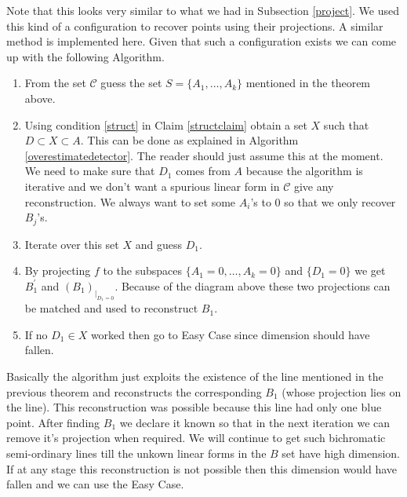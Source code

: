 \documentclass[letterpaper,USenglish,numberwithinsect]{lipics}
\newcommand{\MC}{\mathcal{C}}
\begin{document}
Note that this looks very similar to what we had in Subsection \ref{project}. We used this kind of a configuration to recover
points using their projections. A similar method is implemented here. Given that such a configuration exists
we can come up with the following Algorithm.
\begin{enumerate}
 \item From the set $\MC$ guess the set $S=\{A_1,\ldots,A_k\}$ mentioned in the theorem above.
 \item Using condition \ref{struct} in Claim \ref{structclaim} obtain a set $X$ such that $D\subset X\subset A$.
 This can be done as explained in Algorithm \ref{overestimatedetector}. The reader should just assume this at the moment. We need to
 make sure that $D_1$ comes from $A$ because the algorithm is iterative and we don't want a spurious linear form in $\MC$ give any
 reconstruction. We always want to set some $A_i$'s to $0$ so that we only recover $B_j$'s.
 \item Iterate over this set $X$ and guess $D_1$.
 \item By projecting $f$ to the subspaces $\{A_1=0,\ldots, A_k=0\}$ and $\{D_1=0\}$ we get $B_1^\prime$ and $({B_1})_{|_{D_1=0}}$. Because
 of the diagram above these two projections can be matched and used to reconstruct $B_1$.
 \item If no $D_1\in X$ worked then go to Easy Case since dimension  should have fallen.
\end{enumerate}

Basically the algorithm just exploits the existence of the line mentioned in the previous theorem and reconstructs the corresponding $B_1$ (whose projection lies on the line).
This reconstruction was possible because this line had only one blue point. After finding $B_1$ we declare it known so that in the next iteration we can remove it's
 projection when required. We will continue to get such bichromatic semi-ordinary lines till the unkown linear forms in the $B$ set have high dimension. If at any stage this reconstruction is not possible then this dimension would have fallen and we can use the Easy Case.
\end{document}
